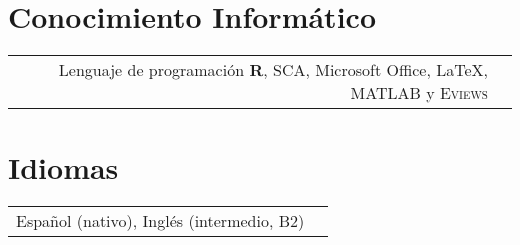 \documentclass[11pt]{article}\usepackage[]{graphicx}\usepackage[]{color}
\begin{document}

\section{Conocimiento Informático} 

\begin{tabular}{rl}

Lenguaje de programación \textbf{\textsf{R}}, SCA, Microsoft Office, {\LaTeX}, \textsc{MATLAB} y \textsc{Eviews}

\end{tabular}
\vspace{10pt}


\section{Idiomas} 

\begin{tabular}{rl}
Español (nativo), Inglés (intermedio, B2) 

\end{tabular}
\end{document}
